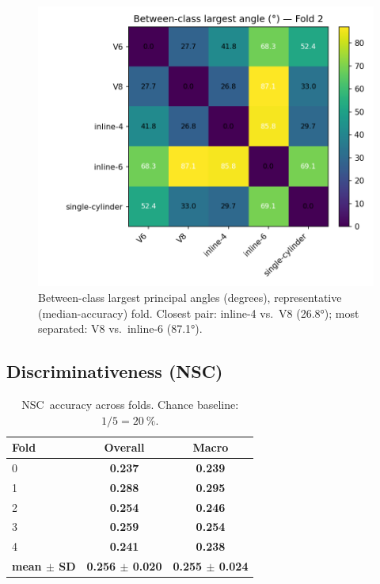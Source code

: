 \documentclass[11pt]{article}
\newcommand{\NSC}{NSC\xspace}
\begin{document}
\begin{figure}[!htbp]
\centering
\includegraphics[width=\linewidth]{rep_angles_heatmap.png}
\caption{Between-class largest principal angles (degrees), representative (median-accuracy) fold. Closest pair: inline-4 vs.\ V8 (\ang{26.8}); most separated: V8 vs.\ inline-6 (\ang{87.1}).}
\label{fig:angles}
\end{figure}

\subsection{Discriminativeness (\NSC)}

\begin{table}[!htbp]
\caption{\NSC\ accuracy across folds. Chance baseline: $1/5=\SI{20}{\percent}$.}
\label{tab:nsc}
\centering
\begin{tabular}{lcc}
\toprule
\textbf{Fold} & \textbf{Overall} & \textbf{Macro} \\
\midrule
0 & \textbf{0.237} & \textbf{0.239} \\
1 & \textbf{0.288} & \textbf{0.295} \\
2 & \textbf{0.254} & \textbf{0.246} \\
3 & \textbf{0.259} & \textbf{0.254} \\
4 & \textbf{0.241} & \textbf{0.238} \\
\midrule
\textbf{mean $\pm$ SD} & \textbf{0.256 $\pm$ 0.020} & \textbf{0.255 $\pm$ 0.024} \\
\bottomrule
\end{tabular}
\end{table}
\end{document}
